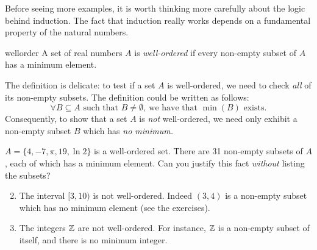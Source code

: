 %     

Before seeing more examples, it is worth thinking more carefully about the logic behind induction. The fact that induction really works depends on a fundamental property of the natural numbers.

\begin{defn}{}{wellorder}
	A set of real numbers $A$ is \emph{well-ordered} if every non-empty subset of $A$ has a minimum element.
\end{defn}

The definition is delicate: to test if a set $A$ is well-ordered, we need to check \emph{all} of its non-empty subsets. The definition could be written as follows:
\[
	\forall B\subseteq A\text{ such that }B\neq\emptyset,\ \text{we have that $\min(B)$ exists.}
\]
Consequently, to show that a set $A$ is \emph{not} well-ordered, we need only exhibit a non-empty subset $B$ which has \emph{no minimum.}

\begin{examples}{}{}
	\exstart $A=\{4,-7,\pi,19,\ln 2\}$ is a well-ordered set. There are 31 non-empty subsets of $A$, each of which has a minimum element. Can you justify this fact \emph{without} listing the subsets?
	\begin{enumerate}\setcounter{enumi}{1}
	  \item The interval $[3,10)$ is not well-ordered. Indeed $(3,4)$ is a non-empty subset which has no minimum element (see the exercises).
	  \item The integers $\mathbb{Z}$ are not well-ordered. For instance, $\mathbb{Z}$ is a non-empty subset of itself, and there is no minimum integer.
	\end{enumerate}
\end{examples}

